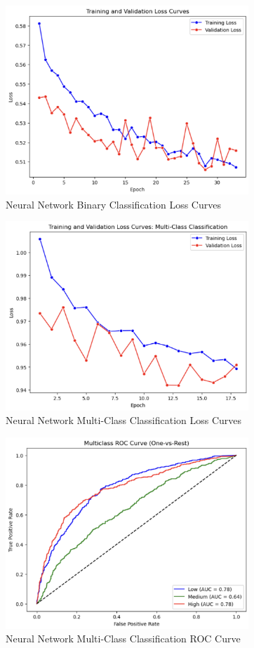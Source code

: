 \documentclass[
  11pt,
]{article}
\begin{document}
\begin{figure}[H]

{\centering \includegraphics[width=3.6in,height=\textheight]{../images/nn-binary-loss-curves.png}

}

\caption{Neural Network Binary Classification Loss Curves}

\end{figure}%
\begin{figure}[H]

{\centering \includegraphics[width=3.6in,height=\textheight]{../images/nn-multi-loss-curves.png}

}

\caption{Neural Network Multi-Class Classification Loss Curves}

\end{figure}%
\begin{figure}[H]

{\centering \includegraphics[width=3.6in,height=\textheight]{../images/nn-multi-roc.png}

}

\caption{Neural Network Multi-Class Classification ROC Curve}

\end{figure}%
\end{document}
